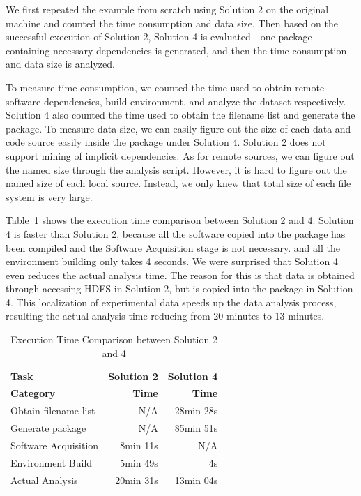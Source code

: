 \documentclass{sig-alternate}
\begin{document}
We first repeated the example from scratch using Solution 2 on the original machine and counted the time consumption and data size. 
Then based on the successful execution of Solution 2, Solution 4 is evaluated - one package containing necessary dependencies is generated, and then the time consumption and data size is analyzed. 

To measure time consumption, we counted the time used to obtain remote software dependencies, build environment, and analyze the dataset respectively. Solution 4 also counted the time used to obtain the filename list and generate the package. To measure data size, we can easily figure out the size of each data and code source easily inside the package under Solution 4.
Solution 2 does not support mining of implicit dependencies. As for remote sources, we can figure out the named size through the analysis script. However, it is hard to figure out the named size of each local source. 
Instead, we only knew that total size of each file system is very large.

Table~\ref{table:time-2nd3rd} shows the execution time comparison between
Solution 2 and 4.
Solution 4 is faster than Solution 2, because all the software copied into the package has been compiled and the Software Acquisition stage is not necessary.
and all the environment building only takes 4 seconds.
We were surprised that Solution 4 even reduces the actual analysis time. 
The reason for this is that data is obtained through accessing HDFS in Solution 2, but is copied into the package in Solution 4. This localization of experimental data speeds up the data analysis process, resulting the actual analysis time reducing from 20 minutes to 13 minutes.

\begin{table}
    \centering
    \begin{tabular}{|l|r|r|}
    \hline
    \bf Task & \bf Solution 2& \bf Solution 4\\ 
    \bf Category & \bf Time & \bf Time \\ \hline
    Obtain filename list & N/A & 28min 28s \\ \hline
    Generate package & N/A & 85min 51s \\ \hline
    Software Acquisition & 8min 11s & N/A \\ \hline
    Environment Build & 5min 49s  & 4s \\ \hline
    Actual Analysis & 20min 31s & 13min 04s \\ \hline
    \end{tabular}
    \caption{Execution Time Comparison between Solution 2 and 4}
    \label{table:time-2nd3rd}
\end{table}    
\end{document}
